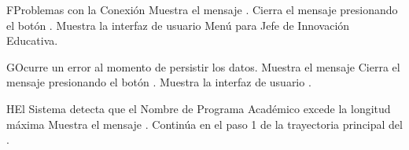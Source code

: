 \begin{UCtrayectoriaA}{F}{Problemas con la Conexión}
    \UCpaso Muestra el mensaje .
    \UCpaso[\UCactor] Cierra el mensaje presionando el botón .
\UCpaso Muestra la interfaz de usuario Menú para Jefe de Innovación Educativa.
\end{UCtrayectoriaA}

\begin{UCtrayectoriaA}{G}{Ocurre un error al momento de persistir los datos.}
    \UCpaso Muestra el mensaje 
    \UCpaso[\UCactor] Cierra el mensaje presionando el botón .
    \UCpaso Muestra la interfaz de usuario .
\end{UCtrayectoriaA}
\begin{UCtrayectoriaA}{H}{El Sistema detecta que el Nombre de Programa Académico excede la longitud máxima}
    \UCpaso Muestra el mensaje .
    \UCpaso Continúa en el paso 1 de la trayectoria principal del .
\end{UCtrayectoriaA}
